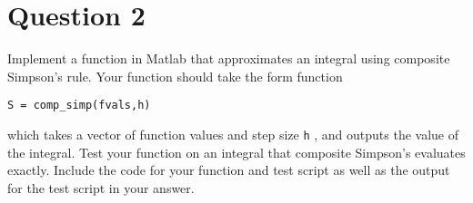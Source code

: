 \section{Question 2}

\begin{question}
    Implement a function in Matlab that approximates an integral using composite Simpson’s rule. Your function should take the form function
    
    \verb+S = comp_simp(fvals,h)+ 
    
    which takes a vector of function values and step size \verb+h+ , and outputs the value of the integral. Test your function on an integral that composite Simpson’s evaluates exactly. Include the code for your function and test script as well as the output for the test script in your answer.
\end{question}

\begin{answer}

\end{answer}